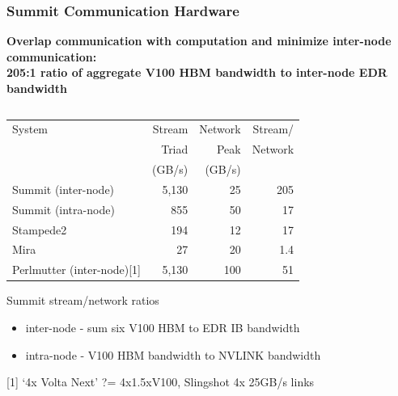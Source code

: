 \documentclass[aspectratio=169]{beamer}
\begin{document}
\begin{frame}
  \frametitle{Summit Communication Hardware}
  \textbf{Overlap communication with computation and minimize inter-node
  communication:\\
  205:1 ratio of aggregate V100 HBM bandwidth to inter-node EDR bandwidth}
    \begin{columns}
    \begin{column}{0.7\textwidth}
      \small
      \begin{table}[]
        \begin{tabular}{lrrr}
        System                      & Stream & Network & Stream/ \\
                                    & Triad  & Peak    & Network \\
                                    & (GB/s) & (GB/s)  & \\
        Summit (inter-node)         & 5,130  & 25      & 205     \\
        Summit (intra-node)         & 855    & 50      & 17      \\
        Stampede2                   & 194    & 12      & 17      \\
        Mira                        & 27     & 20      & 1.4 \\
        \hline
        Perlmutter (inter-node)[1] & 5,130  & 100     & 51   \\
        \hline
        \end{tabular}
      \end{table}
      {\small
        Summit stream/network ratios
        \begin{itemize}
          \item inter-node - sum six V100 HBM to EDR IB bandwidth
          \item intra-node - V100 HBM bandwidth to NVLINK bandwidth
        \end{itemize}
        [1] `4x Volta Next' ?= 4x1.5xV100, Slingshot 4x 25GB/s links
      }
    \end{column}
    \begin{column}{0.3\textwidth}
      \begin{figure}
        \centering

\end{figure}
\end{column}
\end{columns}
\end{frame}
\end{document}
